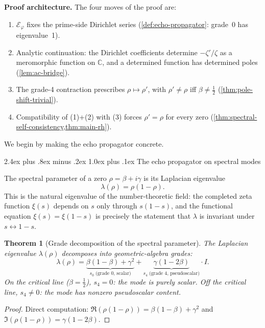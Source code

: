 \documentclass[11pt,a4paper]{article}
\makeatletter
\theoremstyle{plain}
\newtheorem{theorem}{Theorem}[section]
\theoremstyle{definition}
\theoremstyle{remark}
\numberwithin{equation}{section}
\newcommand{\vp}{\varphi}
\renewcommand{\subsection}{%
  \@startsection{subsection}{2}{0pt}%
    {2.4ex plus .8ex minus .2ex}%
    {1.0ex plus .1ex}%
    {\normalfont\Large\bfseries\color{headingAccent}}%
}
\makeatother
\begin{document}
\medskip\noindent\textbf{Proof architecture.}
The four moves of the proof are:
\begin{enumerate}
  \item $\mathcal{E}_\vp$ fixes the prime-side Dirichlet series
    (\cref{def:echo-propagator}: grade~0 has eigenvalue~1).
  \item Analytic continuation: the Dirichlet coefficients determine
    $-\zeta'/\zeta$ as a meromorphic function on $\mathbb{C}$, and
    a determined function has determined poles
    (\cref{lem:ac-bridge}).
  \item The grade-4 contraction prescribes
    $\rho\mapsto\rho'$, with $\rho'\ne\rho$ iff $\beta\ne\tfrac12$
    (\cref{thm:pole-shift-trivial}).
  \item Compatibility of (1)+(2) with (3) forces
    $\rho'=\rho$ for every zero
    (\cref{thm:spectral-self-consistency,thm:main-rh}).
\end{enumerate}

We begin by making the echo propagator concrete.

\subsection{The echo propagator on spectral modes}
\label{subsec:echo-propagator}

The spectral parameter of a zero \(\rho=\beta+i\gamma\) is its
Laplacian eigenvalue
\[
  \lambda(\rho)=\rho(1-\rho).
\]
This is the natural eigenvalue of the number-theoretic field: the
completed zeta function \(\xi(s)\) depends on \(s\) only through
\(s(1-s)\), and the functional equation \(\xi(s)=\xi(1-s)\)
is precisely the statement that \(\lambda\) is invariant under
\(s\leftrightarrow1-s\).

\begin{theorem}[Grade decomposition of the spectral parameter]
\label{thm:spectral-grade}
The Laplacian eigenvalue \(\lambda(\rho)\) decomposes into geometric-algebra
grades:
\[
  \lambda(\rho)
  =\underbrace{\beta(1-\beta)+\gamma^2}_{\displaystyle s_0\;\text{(grade 0, scalar)}}
  +\underbrace{\gamma(1-2\beta)}_{\displaystyle s_4\;\text{(grade 4, pseudoscalar)}}\cdot I.
\]
On the critical line (\(\beta=\tfrac12\)), \(s_4=0\): the mode is
purely scalar.  Off the critical line, \(s_4\ne0\): the mode has
nonzero pseudoscalar content.
\end{theorem}

\begin{proof}
Direct computation:
\(\Re(\rho(1-\rho))=\beta(1-\beta)+\gamma^2\) and
\(\Im(\rho(1-\rho))=\gamma(1-2\beta)\).
\end{proof}
\end{document}
